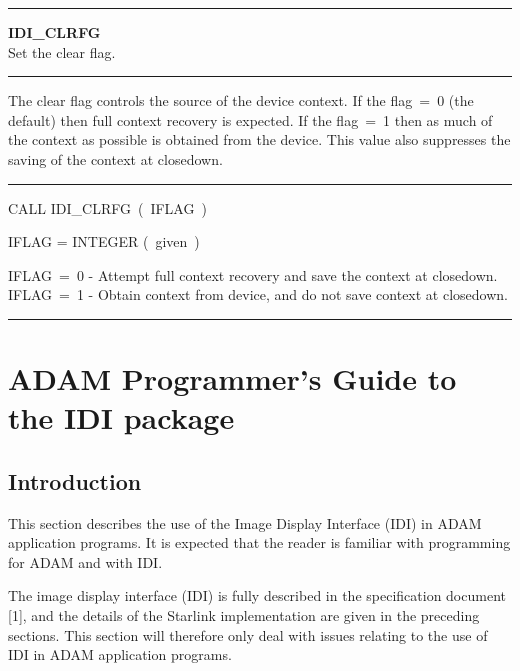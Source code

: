 \vspace{10mm}
\parbox{160mm}{

\rule{160mm}{0.5mm}

\hspace*{10mm}\parbox{140mm}{
{\bf IDI\_CLRFG} \\
Set the clear flag.}

\rule{160mm}{0.1mm}

\hspace*{10mm}\parbox{140mm}{
The clear flag controls the source of the device context. If the flag~=~0
(the default) then full context recovery is expected. If the flag~=~1 then
as much of the context as possible is obtained from the device. This
value also suppresses the saving of the context at closedown.}

\rule{160mm}{0.1mm}

\hspace*{10mm}\parbox{140mm}{
CALL IDI\_CLRFG~(~IFLAG~)}

\hspace*{10mm}\parbox{140mm}{
IFLAG = INTEGER \hspace{10mm} (~given~)}

\hspace*{30mm}\parbox{120mm}{
IFLAG~=~0 - Attempt full context recovery and save the context
at closedown. \\
IFLAG~=~1 - Obtain context from device, and do not save context
at closedown.}

\rule{160mm}{0.5mm}
}

\newpage
\section{ADAM Programmer's Guide to the IDI package}
\label{se:apg}

\subsection{Introduction}

This section describes the use of the Image Display Interface (IDI) in
ADAM application programs. It is expected that the reader is familiar with
programming for ADAM and with IDI.

The image display interface (IDI) is fully described in the specification
document [1], and the details of the Starlink implementation are given in
the preceding sections. This section will therefore only deal with issues
relating to the use of IDI in ADAM application programs.

